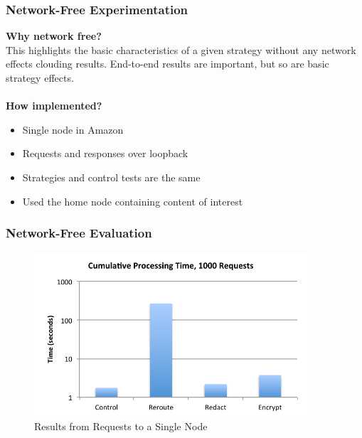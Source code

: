 \documentclass[t,handout]{beamer}
\begin{document}
\begin{frame}
\frametitle{Network-Free Experimentation}
{\bf Why network free?} \\
{\small This highlights the basic characteristics of a given strategy without any network effects clouding results. End-to-end results are important, but so are basic strategy effects.} \\
~\\
{\bf How implemented?}
\begin{small}
\begin{itemize}
\item Single node in Amazon
\item Requests and responses over loopback
\item Strategies and control tests are the same
\item Used the home node containing content of interest
\end{itemize}
\end{small}
\end{frame}

\begin{frame}
\frametitle{Network-Free Evaluation}
\begin{figure}[!t]
\centering
\includegraphics[width=4in]{single-node-results}
\caption{Results from Requests to a Single Node}
\end{figure}
\end{frame}
\end{document}
